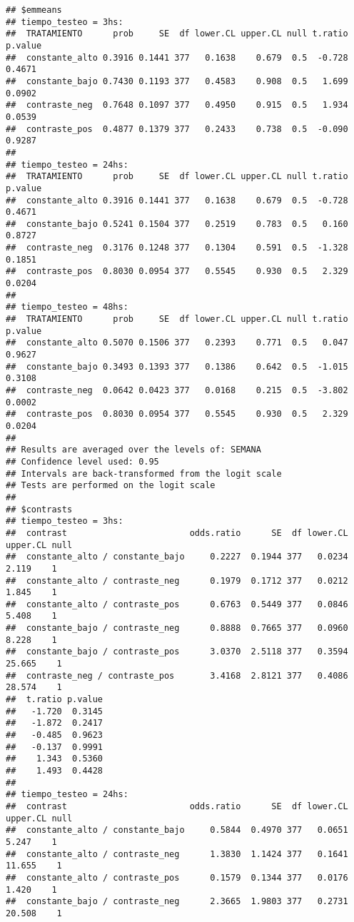 \documentclass[
]{article}
\begin{document}
\begin{verbatim}
## $emmeans
## tiempo_testeo = 3hs:
##  TRATAMIENTO      prob     SE  df lower.CL upper.CL null t.ratio p.value
##  constante_alto 0.3916 0.1441 377   0.1638    0.679  0.5  -0.728  0.4671
##  constante_bajo 0.7430 0.1193 377   0.4583    0.908  0.5   1.699  0.0902
##  contraste_neg  0.7648 0.1097 377   0.4950    0.915  0.5   1.934  0.0539
##  contraste_pos  0.4877 0.1379 377   0.2433    0.738  0.5  -0.090  0.9287
## 
## tiempo_testeo = 24hs:
##  TRATAMIENTO      prob     SE  df lower.CL upper.CL null t.ratio p.value
##  constante_alto 0.3916 0.1441 377   0.1638    0.679  0.5  -0.728  0.4671
##  constante_bajo 0.5241 0.1504 377   0.2519    0.783  0.5   0.160  0.8727
##  contraste_neg  0.3176 0.1248 377   0.1304    0.591  0.5  -1.328  0.1851
##  contraste_pos  0.8030 0.0954 377   0.5545    0.930  0.5   2.329  0.0204
## 
## tiempo_testeo = 48hs:
##  TRATAMIENTO      prob     SE  df lower.CL upper.CL null t.ratio p.value
##  constante_alto 0.5070 0.1506 377   0.2393    0.771  0.5   0.047  0.9627
##  constante_bajo 0.3493 0.1393 377   0.1386    0.642  0.5  -1.015  0.3108
##  contraste_neg  0.0642 0.0423 377   0.0168    0.215  0.5  -3.802  0.0002
##  contraste_pos  0.8030 0.0954 377   0.5545    0.930  0.5   2.329  0.0204
## 
## Results are averaged over the levels of: SEMANA 
## Confidence level used: 0.95 
## Intervals are back-transformed from the logit scale 
## Tests are performed on the logit scale 
## 
## $contrasts
## tiempo_testeo = 3hs:
##  contrast                        odds.ratio      SE  df lower.CL upper.CL null
##  constante_alto / constante_bajo     0.2227  0.1944 377   0.0234    2.119    1
##  constante_alto / contraste_neg      0.1979  0.1712 377   0.0212    1.845    1
##  constante_alto / contraste_pos      0.6763  0.5449 377   0.0846    5.408    1
##  constante_bajo / contraste_neg      0.8888  0.7665 377   0.0960    8.228    1
##  constante_bajo / contraste_pos      3.0370  2.5118 377   0.3594   25.665    1
##  contraste_neg / contraste_pos       3.4168  2.8121 377   0.4086   28.574    1
##  t.ratio p.value
##   -1.720  0.3145
##   -1.872  0.2417
##   -0.485  0.9623
##   -0.137  0.9991
##    1.343  0.5360
##    1.493  0.4428
## 
## tiempo_testeo = 24hs:
##  contrast                        odds.ratio      SE  df lower.CL upper.CL null
##  constante_alto / constante_bajo     0.5844  0.4970 377   0.0651    5.247    1
##  constante_alto / contraste_neg      1.3830  1.1424 377   0.1641   11.655    1
##  constante_alto / contraste_pos      0.1579  0.1344 377   0.0176    1.420    1
##  constante_bajo / contraste_neg      2.3665  1.9803 377   0.2731   20.508    1

\end{verbatim}
\end{document}
